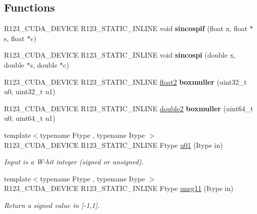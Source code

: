 \subsection*{Functions}
\begin{DoxyCompactItemize}
\item 
\hypertarget{namespacer123_a44c7b96d6943ef6f07a688c976fae5c4}{}\label{namespacer123_a44c7b96d6943ef6f07a688c976fae5c4} 
R123\+\_\+\+C\+U\+D\+A\+\_\+\+D\+E\+V\+I\+CE R123\+\_\+\+S\+T\+A\+T\+I\+C\+\_\+\+I\+N\+L\+I\+NE void {\bfseries sincospif} (float x, float $\ast$s, float $\ast$c)
\item 
\hypertarget{namespacer123_a603446b853f885a101ec6752f5da9e47}{}\label{namespacer123_a603446b853f885a101ec6752f5da9e47} 
R123\+\_\+\+C\+U\+D\+A\+\_\+\+D\+E\+V\+I\+CE R123\+\_\+\+S\+T\+A\+T\+I\+C\+\_\+\+I\+N\+L\+I\+NE void {\bfseries sincospi} (double x, double $\ast$s, double $\ast$c)
\item 
\hypertarget{namespacer123_afe781081ff63812582c2f02af778a1f5}{}\label{namespacer123_afe781081ff63812582c2f02af778a1f5} 
R123\+\_\+\+C\+U\+D\+A\+\_\+\+D\+E\+V\+I\+CE R123\+\_\+\+S\+T\+A\+T\+I\+C\+\_\+\+I\+N\+L\+I\+NE \hyperlink{structr123_1_1float2}{float2} {\bfseries boxmuller} (uint32\+\_\+t u0, uint32\+\_\+t u1)
\item 
\hypertarget{namespacer123_a641db790ccf468913483f1d23bb009c0}{}\label{namespacer123_a641db790ccf468913483f1d23bb009c0} 
R123\+\_\+\+C\+U\+D\+A\+\_\+\+D\+E\+V\+I\+CE R123\+\_\+\+S\+T\+A\+T\+I\+C\+\_\+\+I\+N\+L\+I\+NE \hyperlink{structr123_1_1double2}{double2} {\bfseries boxmuller} (uint64\+\_\+t u0, uint64\+\_\+t u1)
\item 
{\footnotesize template$<$typename Ftype , typename Itype $>$ }\\R123\+\_\+\+C\+U\+D\+A\+\_\+\+D\+E\+V\+I\+CE R123\+\_\+\+S\+T\+A\+T\+I\+C\+\_\+\+I\+N\+L\+I\+NE Ftype \hyperlink{group__uniform_gafc96ad616364743e209c836450cc4107}{u01} (Itype in)
\begin{DoxyCompactList}\small\item\em Input is a W-\/bit integer (signed or unsigned). \end{DoxyCompactList}\item 
{\footnotesize template$<$typename Ftype , typename Itype $>$ }\\R123\+\_\+\+C\+U\+D\+A\+\_\+\+D\+E\+V\+I\+CE R123\+\_\+\+S\+T\+A\+T\+I\+C\+\_\+\+I\+N\+L\+I\+NE Ftype \hyperlink{group__uniform_ga49eb4e2f3522f1b5e22b66bdc86345ce}{uneg11} (Itype in)
\begin{DoxyCompactList}\small\item\em Return a signed value in \mbox{[}-\/1,1\mbox{]}. \end{DoxyCompactList}\item 

\end{DoxyCompactItemize}
